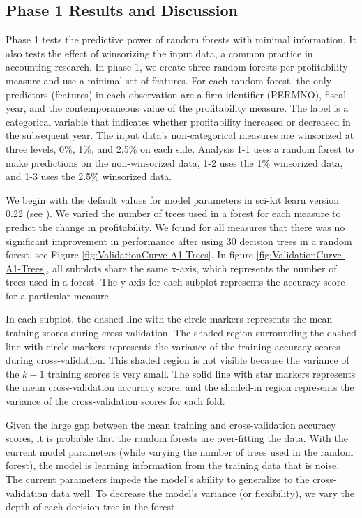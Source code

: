 \subsection{Phase 1 Results and Discussion}
Phase 1 tests the predictive power of random forests with minimal information. It also tests the effect of winsorizing the input data, a common practice in accounting research.  In phase 1, we create three random forests per profitability measure and use a minimal set of features. For each random forest, the only predictors (features) in each observation are a firm identifier (PERMNO),  fiscal year, and the contemporaneous value of the profitability measure. The label is a categorical variable that indicates whether profitability increased or decreased in the subsequent year. The input data's non-categorical measures are winsorized at three levels, 0\%, 1\%, and 2.5\% on each side. Analysis 1-1 uses a random forest to make predictions on the non-winsorized data, 1-2 uses the 1\% winsorized data, and 1-3 uses the 2.5\% winsorized data.

We begin with the default values for model parameters in sci-kit learn version 0.22 (see \cite{scikit-learn}). We varied the number of trees used in a forest for each measure to predict the change in profitability. We found for all measures that there was no significant improvement in performance after using 30 decision trees in a random forest, see Figure \ref{fig:ValidationCurve-A1-Trees}. In figure \ref{fig:ValidationCurve-A1-Trees}, all subplots share the same x-axis, which represents the number of trees used in a forest. The y-axis for each subplot represents the accuracy score for a particular measure.

In each subplot, the dashed line with the circle markers represents the mean training scores during cross-validation. The shaded region surrounding the dashed line with circle markers represents the variance of the training accuracy scores during cross-validation.  This shaded region is not visible because the variance of the \(k-1\) training scores is very small. The solid line with star markers represents the mean cross-validation accuracy score, and the shaded-in region represents the variance of the cross-validation scores for each fold.

Given the large gap between the mean training and cross-validation accuracy scores, it is probable that the random forests are over-fitting the data. With the current model parameters (while varying the number of trees used in the random forest), the model is learning information from the training data that is noise. The current parameters impede the model's ability to generalize to the cross-validation data well. To decrease the model's variance (or flexibility), we vary the depth of each decision tree in the forest. 

